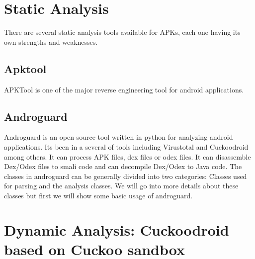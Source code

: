 \documentclass{article}
\begin{document}
		\pagebreak
		
	\section{Static Analysis}\label{sec:static_analysis}
		There are several static analysis tools available for APKs, each one having its own strengths and weaknesses.
	
		
		\lipsum[1]
			\subsection{Apktool}\label{sec:apktool}
			APKTool is one of the major reverse engineering tool for android applications.  
			\lipsum[2]
			\subsection{Androguard}\label{sec:androguard}
			Androguard is an open source tool written in python for analyzing android applications. Its been in a several of tools including Virustotal and Cuckoodroid among others. It can process APK files, dex files or odex files. It can disassemble Dex/Odex files to smali code and can decompile Dex/Odex to Java code. The classes in androguard can be generally divided into two categories: Classes used for parsing and the analysis classes. We will go into more details about these classes but first we will show some basic usage of androguard.
			

			
			\lipsum[1]
			\lipsum[1]
			\lipsum[1]
			\lipsum[1]
			\lipsum[1]
			\lipsum[1]
			\lipsum[1]
			\lipsum[1]
			\pagebreak
	\section{Dynamic Analysis: Cuckoodroid based on Cuckoo sandbox}\label{sec:cuckoodroid}
		
\end{document}
